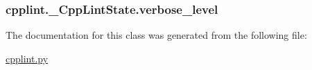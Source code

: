 \subsubsection[{\texorpdfstring{verbose\+\_\+level}{verbose_level}}]{\setlength{\rightskip}{0pt plus 5cm}cpplint.\+\_\+\+Cpp\+Lint\+State.\+verbose\+\_\+level}\hypertarget{classcpplint_1_1__CppLintState_a94328754c2f7481f4da9757a9dede308}{}\label{classcpplint_1_1__CppLintState_a94328754c2f7481f4da9757a9dede308}


The documentation for this class was generated from the following file\+:\begin{DoxyCompactItemize}
\item 
\hyperlink{cpplint_8py}{cpplint.\+py}\end{DoxyCompactItemize}
